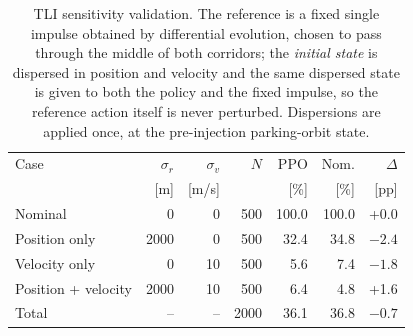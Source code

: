 \begin{table}[hbt!]
\centering
\small
\caption{TLI sensitivity validation. The reference is a fixed single impulse obtained by differential evolution, chosen to pass through the middle of both corridors; the \emph{initial state} is dispersed in position and velocity and the same dispersed state is given to both the policy and the fixed impulse, so the reference action itself is never perturbed. Dispersions are applied once, at the pre-injection parking-orbit state.}
\label{tab:tli_sensitivity}
\begin{tabular}{lrrrrrr}
\toprule
Case & $\sigma_r$ & $\sigma_v$ & $N$ & PPO & Nom. & $\Delta$ \\
 & [m] & [m/s] & & [\%] & [\%] & [pp] \\
\midrule
Nominal & 0 & 0 & 500 & 100.0 & 100.0 & +0.0 \\
Position only & 2000 & 0 & 500 & 32.4 & 34.8 & $-2.4$ \\
Velocity only & 0 & 10 & 500 & 5.6 & 7.4 & $-1.8$ \\
Position + velocity & 2000 & 10 & 500 & 6.4 & 4.8 & +1.6 \\
\midrule
Total & -- & -- & 2000 & 36.1 & 36.8 & $-0.7$ \\
\bottomrule
\end{tabular}
\end{table}